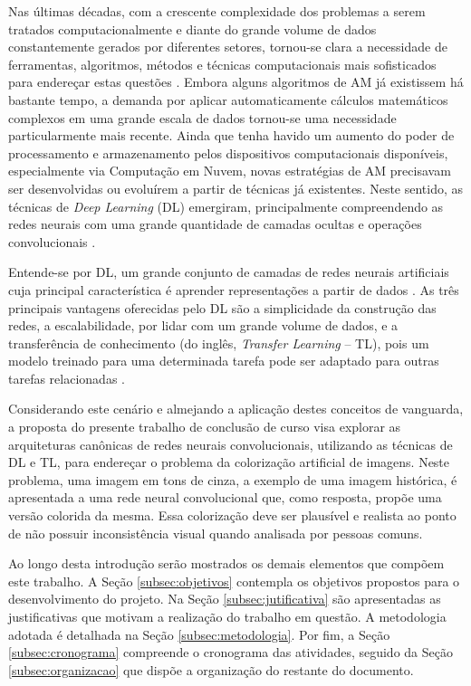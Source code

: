 Nas últimas décadas, com a crescente complexidade dos problemas a serem tratados computacionalmente e diante do grande volume de dados constantemente gerados por diferentes setores, tornou-se clara a necessidade de ferramentas, algoritmos, métodos e técnicas computacionais mais sofisticados para endereçar estas questões \cite{ref:faceli}. Embora alguns algoritmos de AM já existissem há bastante tempo, a demanda por aplicar automaticamente cálculos matemáticos complexos em uma grande escala de dados tornou-se uma necessidade particularmente mais recente. Ainda que tenha havido um aumento do poder de processamento e armazenamento pelos dispositivos computacionais disponíveis, especialmente via Computação em Nuvem, novas estratégias de AM precisavam ser desenvolvidas ou evoluírem a partir de técnicas já existentes. Neste sentido, as técnicas de \emph{Deep Learning} (DL) emergiram, principalmente compreendendo as redes neurais com uma grande quantidade de camadas ocultas e operações convolucionais \cite{ref:khan}.

Entende-se por DL, um grande conjunto de camadas de redes neurais artificiais cuja principal característica é aprender representações a partir de dados \cite{ref:buduma,ref:chollet}.  As três principais vantagens oferecidas pelo DL são a simplicidade da construção das redes, a escalabilidade, por lidar com um grande volume de dados, e a transferência de conhecimento (do inglês, \textit{Transfer Learning} -- TL), pois um modelo treinado para uma determinada tarefa pode ser adaptado para outras tarefas relacionadas \cite{ref:khan}.

Considerando este cenário e almejando a aplicação destes conceitos de vanguarda, a proposta do presente trabalho de conclusão de curso visa explorar as arquiteturas canônicas de redes neurais convolucionais, utilizando as técnicas de DL e TL, para endereçar o problema da colorização artificial de imagens. Neste problema, uma imagem em tons de cinza, a exemplo de uma imagem histórica, é apresentada a uma rede neural convolucional que, como resposta, propõe uma versão colorida da mesma. Essa colorização deve ser plausível e realista ao ponto de não possuir inconsistência visual quando analisada por pessoas comuns.

Ao longo desta introdução serão mostrados os demais elementos que compõem este trabalho. A Seção \ref{subsec:objetivos} contempla os objetivos propostos para o desenvolvimento do projeto. Na Seção \ref{subsec:jutificativa} são apresentadas as justificativas  que motivam a realização do trabalho em questão. A metodologia adotada é detalhada na Seção \ref{subsec:metodologia}. Por fim, a Seção \ref{subsec:cronograma}  compreende o cronograma das atividades, seguido da Seção \ref{subsec:organizacao} que dispõe a organização do restante do documento.

